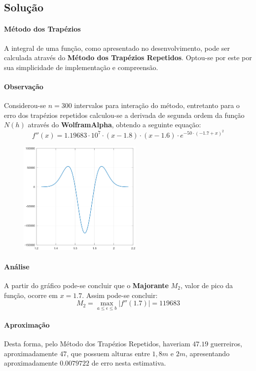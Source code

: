 \documentclass{article}
\begin{document}
        \subsection{Solução}
            \paragraph{Método dos Trapézios}A integral de uma função, como apresentado no desenvolvimento, pode ser calculada através do \textbf{Método dos Trapézios Repetidos}. Optou-se por este por sua simplicidade de implementação e compreensão.

            \paragraph{Observação}Considerou-se $n = 300$ intervalos para interação do método, entretanto para o erro dos trapézios repetidos calculou-se a derivada de segunda ordem da função $N(h)$ através do \textbf{WolframAlpha}, obtendo a seguinte equação:
            \[\boxed{f''(x) = 1.19683 \cdot 10^{7} \cdot (x -1.8)\cdot(x -1.6) \cdot e^{-50 \cdot (-1.7 + x)^2}}\]

                \begin{figure}[h]
                    \includegraphics[width = 6cm]{derivada.png}
                    \centering
                \end{figure}
            \paragraph{Análise}A partir do gráfico pode-se concluir que o \textbf{Majorante} $M_{2}$, valor de pico da função, ocorre em $x = 1.7$. Assim pode-se concluir:
            \[\boxed{M_{2} = \max_{a\leq\epsilon\leq b} |f''(1.7)| = 119683}\]

            \paragraph{Aproximação}Desta forma, pelo Método dos Trapézios Repetidos, haveriam $47.19$ guerreiros, aproximadamente $47$, que possuem alturas entre $1,8m$ e $2m$, apresentando aproximadamente $0.0079722$ de erro nesta estimativa.
\end{document}
